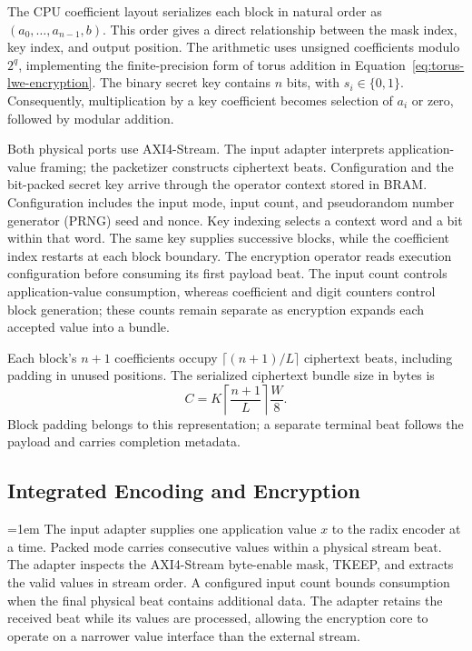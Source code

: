 \documentclass[sigconf,anonymous,balance=false]{acmart}
\newcommand{\bodypar}{\par\vskip 0pt plus 6pt\relax}
\begin{document}
The CPU coefficient layout serializes each block in natural order as $(a_0,\ldots,a_{n-1},b)$. This order gives a direct relationship between the mask index, key index, and output position. The arithmetic uses unsigned coefficients modulo $2^q$, implementing the finite-precision form of torus addition in Equation~\eqref{eq:torus-lwe-encryption}. The binary secret key contains $n$ bits, with $s_i\in\{0,1\}$. Consequently, multiplication by a key coefficient becomes selection of $a_i$ or zero, followed by modular addition.
\bodypar

Both physical ports use AXI4-Stream. The input adapter interprets application-value framing; the packetizer constructs ciphertext beats. Configuration and the bit-packed secret key arrive through the operator context stored in BRAM. Configuration includes the input mode, input count, and pseudorandom number generator (PRNG) seed and nonce. Key indexing selects a context word and a bit within that word. The same key supplies successive blocks, while the coefficient index restarts at each block boundary. The encryption operator reads execution configuration before consuming its first payload beat. The input count controls application-value consumption, whereas coefficient and digit counters control block generation; these counts remain separate as encryption expands each accepted value into a bundle.

Each block's $n+1$ coefficients occupy $\lceil(n+1)/L\rceil$ ciphertext beats, including padding in unused positions. The serialized ciphertext bundle size in bytes is
\begin{equation}
  C=K\left\lceil\frac{n+1}{L}\right\rceil\frac{W}{8}.
  \label{eq:tfhe-bundle-size}
\end{equation}
Block padding belongs to this representation; a separate terminal beat follows the payload and carries completion metadata.

\subsection{Integrated Encoding and Encryption}
\label{subsec:tfhe-encryption}

\begingroup
\emergencystretch=1em
The input adapter supplies one application value $x$ to the radix encoder at a time. Packed mode carries consecutive values within a physical stream beat. The adapter inspects the AXI4-Stream byte-enable mask, TKEEP, and extracts the valid values in stream order. A configured input count bounds consumption when the final physical beat contains additional data. The adapter retains the received beat while its values are processed, allowing the encryption core to operate on a narrower value interface than the external stream.
\par
\endgroup
\bodypar
\end{document}
